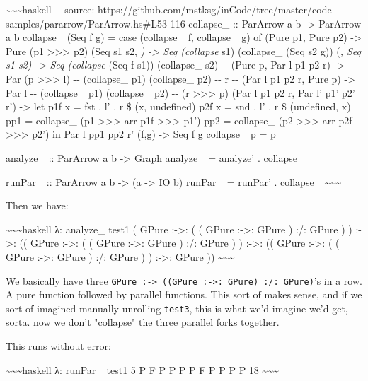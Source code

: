 \documentclass[]{article}
\begin{document}
\textasciitilde{}\textasciitilde{}\textasciitilde{}haskell -\/- source:
https://github.com/mstksg/inCode/tree/master/code-samples/pararrow/ParArrow.hs\#L53-116
collapse\_ :: ParArrow a b -\textgreater{} ParArrow a b collapse\_ (Seq f g) =
case (collapse\_ f, collapse\_ g) of (Pure p1, Pure p2) -\textgreater{} Pure (p1
\textgreater{}\textgreater{}\textgreater{} p2) (Seq s1 s2, \emph{)
-\textgreater{} Seq (collapse} s1) (collapse\_ (Seq s2 g)) (\emph{, Seq s1 s2)
-\textgreater{} Seq (collapse} (Seq f s1)) (collapse\_ s2) -\/- (Pure p, Par l
p1 p2 r) -\textgreater{} Par (p \textgreater{}\textgreater{}\textgreater{} l)
-\/- (collapse\_ p1) (collapse\_ p2) -\/- r -\/- (Par l p1 p2 r, Pure p)
-\textgreater{} Par l -\/- (collapse\_ p1) (collapse\_ p2) -\/- (r
\textgreater{}\textgreater{}\textgreater{} p) (Par l p1 p2 r, Par l' p1' p2' r')
-\textgreater{} let p1f x = fst . l' . r \$ (x, undefined) p2f x = snd . l' . r
\$ (undefined, x) pp1 = collapse\_ (p1
\textgreater{}\textgreater{}\textgreater{} arr p1f
\textgreater{}\textgreater{}\textgreater{} p1') pp2 = collapse\_ (p2
\textgreater{}\textgreater{}\textgreater{} arr p2f
\textgreater{}\textgreater{}\textgreater{} p2') in Par l pp1 pp2 r' (f,g)
-\textgreater{} Seq f g collapse\_ p = p

analyze\_ :: ParArrow a b -\textgreater{} Graph analyze\_ = analyze' .
collapse\_

runPar\_ :: ParArrow a b -\textgreater{} (a -\textgreater{} IO b) runPar\_ =
runPar' . collapse\_ \textasciitilde{}\textasciitilde{}\textasciitilde{}

Then we have:

\textasciitilde{}\textasciitilde{}\textasciitilde{}haskell λ: analyze\_ test1 (
GPure :-\textgreater{}: ( ( GPure :-\textgreater{}: GPure ) :/: GPure ) )
:-\textgreater{}: (( GPure :-\textgreater{}: ( ( GPure :-\textgreater{}: GPure )
:/: GPure ) ) :-\textgreater{}: (( GPure :-\textgreater{}: ( ( GPure
:-\textgreater{}: GPure ) :/: GPure ) ) :-\textgreater{}: GPure ))
\textasciitilde{}\textasciitilde{}\textasciitilde{}

We basically have three
\texttt{GPure\ :-\textgreater{}\ ((GPure\ :-\textgreater{}:\ GPure)\ :/:\ GPure)}'s
in a row. A pure function followed by parallel functions. This sort of makes
sense, and if we sort of imagined manually unrolling \texttt{test3}, this is
what we'd imagine we'd get, sorta. now we don't "collapse" the three parallel
forks together.

This runs without error:

\textasciitilde{}\textasciitilde{}\textasciitilde{}haskell λ: runPar\_ test1 5 P
F P P P P F P P P P 18 \textasciitilde{}\textasciitilde{}\textasciitilde{}
\end{document}
